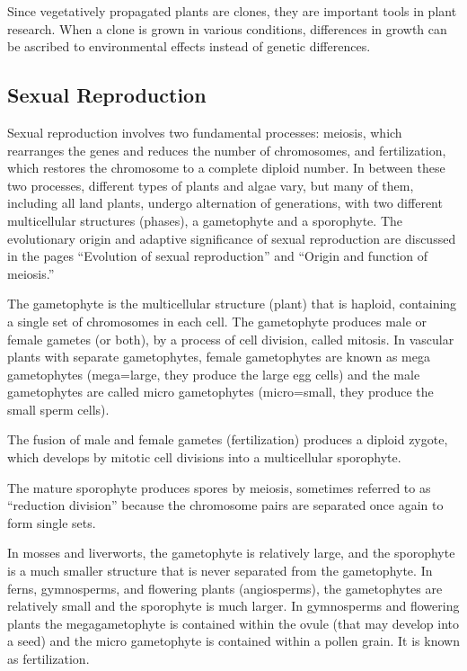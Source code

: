 Since vegetatively propagated plants are clones, they are important tools in plant research. When a clone is grown in various conditions, differences in growth can be ascribed to environmental effects instead of genetic differences.

\hypertarget{sexual-reproduction-2}{%
\subsection{Sexual Reproduction}\label{sexual-reproduction-2}}

Sexual reproduction involves two fundamental processes: meiosis, which rearranges the genes and reduces the number of chromosomes, and fertilization, which restores the chromosome to a complete diploid number. In between these two processes, different types of plants and algae vary, but many of them, including all land plants, undergo alternation of generations, with two different multicellular structures (phases), a gametophyte and a sporophyte. The evolutionary origin and adaptive significance of sexual reproduction are discussed in the pages ``Evolution of sexual reproduction'' and ``Origin and function of meiosis.''

The gametophyte is the multicellular structure (plant) that is haploid, containing a single set of chromosomes in each cell. The gametophyte produces male or female gametes (or both), by a process of cell division, called mitosis. In vascular plants with separate gametophytes, female gametophytes are known as mega gametophytes (mega=large, they produce the large egg cells) and the male gametophytes are called micro gametophytes (micro=small, they produce the small sperm cells).

The fusion of male and female gametes (fertilization) produces a diploid zygote, which develops by mitotic cell divisions into a multicellular sporophyte.

The mature sporophyte produces spores by meiosis, sometimes referred to as ``reduction division'' because the chromosome pairs are separated once again to form single sets.

In mosses and liverworts, the gametophyte is relatively large, and the sporophyte is a much smaller structure that is never separated from the gametophyte. In ferns, gymnosperms, and flowering plants (angiosperms), the gametophytes are relatively small and the sporophyte is much larger. In gymnosperms and flowering plants the megagametophyte is contained within the ovule (that may develop into a seed) and the micro gametophyte is contained within a pollen grain. It is known as fertilization.


